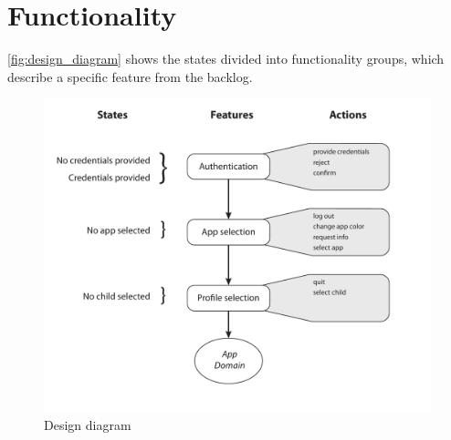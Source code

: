 \section{Functionality}

\autoref{fig:design_diagram} shows the states divided into functionality groups, which describe a specific feature from the backlog.


\begin{figure}[h]
	\centering
	\includegraphics[width=1\textwidth]{gfx/design_diagram.pdf}
	\caption{Design diagram}
	\label{fig:design_diagram}
\end{figure}

